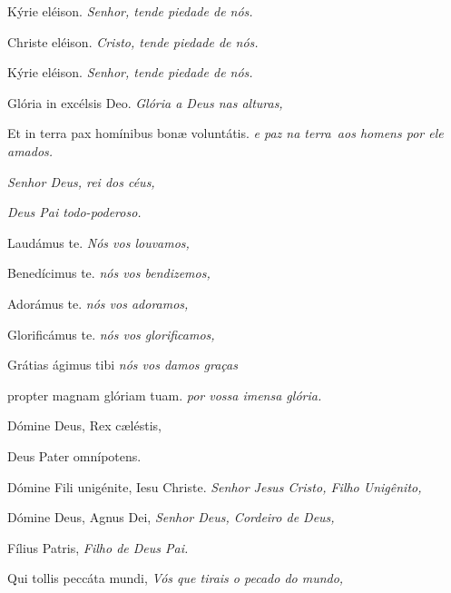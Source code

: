 
\begin{paracol}{2}
  Kýrie eléison.
  \switchcolumn
  \emph{Senhor, tende piedade de nós.}
  \switchcolumn*

  Christe eléison.
  \switchcolumn
  \emph{Cristo, tende piedade de nós.}
  \switchcolumn*

  Kýrie eléison.
  \switchcolumn
  \emph{Senhor, tende piedade de nós.}
\end{paracol}


\begin{paracol}{2}
  Glória in excélsis Deo.
  \switchcolumn
  \emph{Glória a Deus nas alturas,}
  \switchcolumn*

  Et in terra pax homínibus bon{\ae} voluntátis.
  \switchcolumn
  \emph{e paz na terra~aos homens por ele amados.}
  \switchcolumn*

  \switchcolumn
  \emph{Senhor Deus, rei dos céus,}
  \switchcolumn*

  \switchcolumn
  \emph{Deus Pai todo-poderoso.}
  \switchcolumn*

  Laudámus te.
  \switchcolumn
  \emph{Nós vos louvamos,}
  \switchcolumn*

  Benedícimus te.
  \switchcolumn
  \emph{nós vos bendizemos,}
  \switchcolumn*

  Adorámus te.
  \switchcolumn
  \emph{nós vos adoramos,}
  \switchcolumn*

  Glorificámus te.
  \switchcolumn
  \emph{nós vos glorificamos,}
  \switchcolumn*

  Grátias ágimus tibi
  \switchcolumn
  \emph{nós vos damos graças}
  \switchcolumn*

  propter magnam glóriam tuam.
  \switchcolumn
  \emph{por vossa imensa glória.}
  \switchcolumn*

  Dómine Deus, Rex c{\ae}léstis,
  \switchcolumn
  \switchcolumn*

  Deus Pater omnípotens.
  \switchcolumn
  \switchcolumn*

  Dómine Fili unigénite, Iesu Christe.
  \switchcolumn
  \emph{Senhor Jesus Cristo, Filho Unigênito,}
  \switchcolumn*

  Dómine Deus, Agnus Dei,
  \switchcolumn
  \emph{Senhor Deus, Cordeiro de Deus,}
  \switchcolumn*

  Fílius Patris,
  \switchcolumn
  \emph{Filho de Deus Pai.}
  \switchcolumn*

  Qui tollis peccáta mundi,
  \switchcolumn
  \emph{Vós que tirais o pecado do mundo,}
  \switchcolumn*


\end{paracol}
